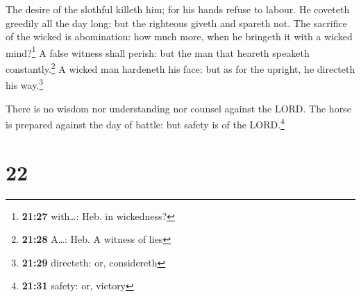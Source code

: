  The desire of the slothful killeth him; for his hands
refuse to labour.  He coveteth greedily all the day long:
but the righteous giveth and spareth not.  The sacrifice
of the wicked is abomination: how much more, when he bringeth it with a
wicked mind?\footnote{\textbf{21:27} with\ldots: Heb. in wickedness?}
 A false witness shall perish: but the man that heareth
speaketh constantly.\footnote{\textbf{21:28} A\ldots: Heb. A witness of
  lies}  A wicked man hardeneth his face: but as for the
upright, he directeth his way.\footnote{\textbf{21:29} directeth: or,
  considereth}

 There is no wisdom nor understanding nor counsel against
the LORD.  The horse is prepared against the day of
battle: but safety is of the LORD.\footnote{\textbf{21:31} safety: or,
  victory}

\hypertarget{section-21}{%
\section{22}\label{section-21}}

